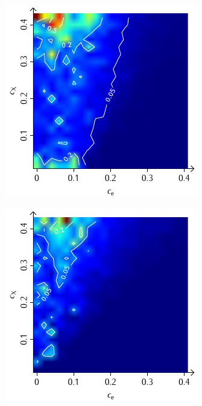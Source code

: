 \documentclass[a4paper, 10pt, twoside, openany]{book} %
\begin{document}
\begin{figure}
\begin{minipage}[t]{0.48\textwidth}
			\label{H_penalty_cluster_G}
		\end{minipage}
		\begin{minipage}[t]{0.48\textwidth}
			\includegraphics[width=\textwidth]{Abbildungen/Phasendiagramme/Konturen/H_random_G.pdf}
			\label{H_random_G}
		\end{minipage}
		\hfill
		\begin{minipage}[t]{0.48\textwidth}
			\includegraphics[width=\textwidth]{Abbildungen/Phasendiagramme/Konturen/H_penalty_random_G.pdf}

\end{minipage}
\end{figure}
\end{document}

